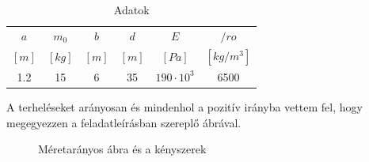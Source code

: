 \documentclass{article}
\begin{document}
	\begin{table}[h!]
		\begin{center}
			\caption{Adatok}
			\label{tab:table1}
			\begin{tabular}{c|c|c|c|c|c} %
				$a$ & $m_{0}$ & $b$ & $d$ & $E$ & $/ro$\\
				$[m]$ & $[kg]$ & $[m]$ & $[m]$ & $[Pa]$ & $[kg/m^{3}]$\\
				\hline
				1.2 & 15 & 6 & 35 & $190\cdot10^3$ & 6500\\
			\end{tabular}
		\end{center}
	\end{table}
	
	\begin{flushleft}
		A terheléseket arányosan és mindenhol a pozitív irányba vettem fel, hogy megegyezzen a feladatleírásban szereplő ábrával.
	\end{flushleft}
	
	\newcommand{\sugar}{2}
	\newcommand{\ab}{600}
	\newcommand{\bc}{120}
	\newcommand{\acv}{701}
	\newcommand{\ac}{720}
	
	
	\begin{figure}[h!]
		
		
		\begin{center}
		\end{center}	
		\caption{Méretarányos ábra és a kényszerek}
	\end{figure}
	
\end{document}
